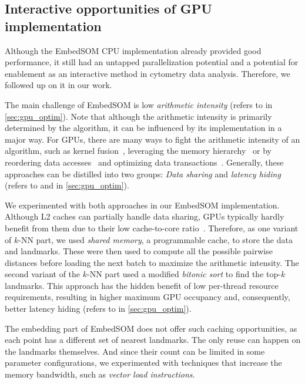 \subsection{Interactive opportunities of GPU implementation}

Although the EmbedSOM CPU implementation already provided good performance, it still had an untapped parallelization potential and a potential for enablement as an interactive method in cytometry data analysis. Therefore, we followed up on it in our work.

The main challenge of EmbedSOM is low \emph{arithmetic intensity} (refers to  in \cref{sec:gpu_optim}). Note that although the arithmetic intensity is primarily determined by the algorithm, it can be influenced by its implementation in a major way. For GPUs, there are many ways to fight the arithmetic intensity of an algorithm, such as kernel fusion~\cite{wahib2014scalable}, leveraging the memory hierarchy~\cite{lee2012cuda} or by reordering data accesses~\cite{ghysels2012improving} and optimizing data transactions~\cite{lu2020optimizing}. Generally, these approaches can be distilled into two groups: \emph{Data sharing} and \emph{latency hiding} (refers to  and  in \cref{sec:gpu_optim}).

We experimented with both approaches in our EmbedSOM implementation. Although L2 caches can partially handle data sharing, GPUs typically hardly benefit from them due to their low cache-to-core ratio~\cite{site:cuda}. Therefore, as one variant of $k$-NN part, we used \emph{shared memory}, a programmable cache, to store the data and landmarks. These were then used to compute all the possible pairwise distances before loading the next batch to maximize the arithmetic intensity. The second variant of the $k$-NN part used a modified \emph{bitonic sort} to find the top-$k$ landmarks. This approach has the hidden benefit of low per-thread resource requirements, resulting in higher maximum GPU occupancy and, consequently, better latency hiding (refers to  in \cref{sec:gpu_optim}).

The embedding part of EmbedSOM does not offer such caching opportunities, as each point has a different set of nearest landmarks. The only reuse can happen on the landmarks themselves. And since their count can be limited in some parameter configurations, we experimented with techniques that increase the memory bandwidth, such as \emph{vector load instructions}.

